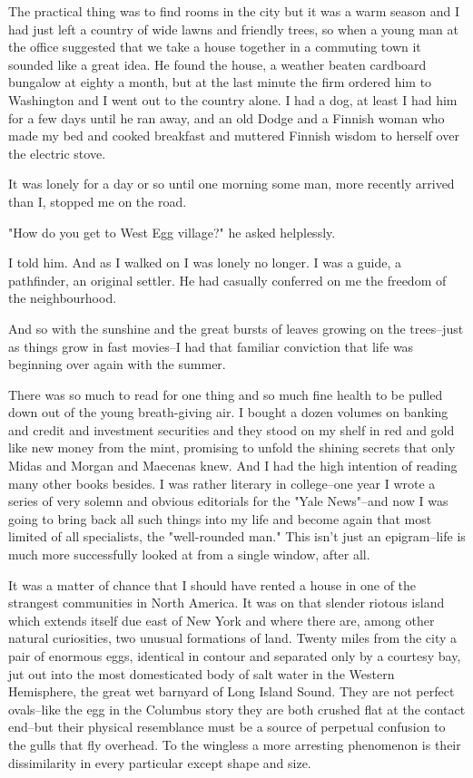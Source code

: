 \documentclass[a4paper,12pt]{article}
\begin{document}
The practical thing was to find rooms in the city but it was a warm
season and I had just left a country of wide lawns and friendly trees,
so when a young man at the office suggested that we take a house
together in a commuting town it sounded like a great idea. He found
the house, a weather beaten cardboard bungalow at eighty a month, but
at the last minute the firm ordered him to Washington and I went out
to the country alone. I had a dog, at least I had him for a few days
until he ran away, and an old Dodge and a Finnish woman who made my bed
and cooked breakfast and muttered Finnish wisdom to herself over the
electric stove.

It was lonely for a day or so until one morning some man, more recently
arrived than I, stopped me on the road.

"How do you get to West Egg village?" he asked helplessly.

I told him. And as I walked on I was lonely no longer. I was a guide, a
pathfinder, an original settler. He had casually conferred on me the
freedom of the neighbourhood.

And so with the sunshine and the great bursts of leaves growing on the
trees--just as things grow in fast movies--I had that familiar
conviction that life was beginning over again with the summer.

There was so much to read for one thing and so much fine health to be
pulled down out of the young breath-giving air. I bought a dozen
volumes on banking and credit and investment securities and they stood
on my shelf in red and gold like new money from the mint, promising to
unfold the shining secrets that only Midas and Morgan and Maecenas
knew. And I had the high intention of reading many other books besides.
I was rather literary in college--one year I wrote a series of very
solemn and obvious editorials for the "Yale News"--and now I was going
to bring back all such things into my life and become again that most
limited of all specialists, the "well-rounded man." This isn't just an
epigram--life is much more successfully looked at from a single window,
after all.

It was a matter of chance that I should have rented a house in one of
the strangest communities in North America. It was on that slender
riotous island which extends itself due east of New York and where
there are, among other natural curiosities, two unusual formations of
land. Twenty miles from the city a pair of enormous eggs, identical in
contour and separated only by a courtesy bay, jut out into the most
domesticated body of salt water in the Western Hemisphere, the great
wet barnyard of Long Island Sound. They are not perfect ovals--like the
egg in the Columbus story they are both crushed flat at the contact
end--but their physical resemblance must be a source of perpetual
confusion to the gulls that fly overhead. To the wingless a more
arresting phenomenon is their dissimilarity in every particular except
shape and size.
\end{document}
